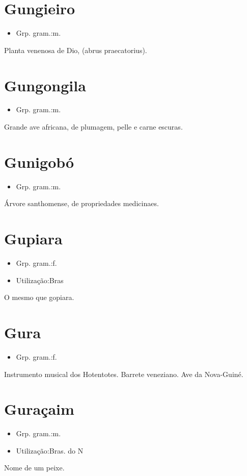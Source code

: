 \section{Gungieiro}
\begin{itemize}
\item {Grp. gram.:m.}
\end{itemize}
Planta venenosa de Dio, (\textunderscore abrus praecatorius\textunderscore ).
\section{Gungongila}
\begin{itemize}
\item {Grp. gram.:m.}
\end{itemize}
Grande ave africana, de plumagem, pelle e carne escuras.
\section{Gunigobó}
\begin{itemize}
\item {Grp. gram.:m.}
\end{itemize}
Árvore santhomense, de propriedades medicinaes.
\section{Gupiara}
\begin{itemize}
\item {Grp. gram.:f.}
\end{itemize}
\begin{itemize}
\item {Utilização:Bras}
\end{itemize}
O mesmo que \textunderscore gopiara\textunderscore .
\section{Gura}
\begin{itemize}
\item {Grp. gram.:f.}
\end{itemize}
Instrumento musical dos Hotentotes.
Barrete veneziano.
Ave da Nova-Guiné.
\section{Guraçaim}
\begin{itemize}
\item {Grp. gram.:m.}
\end{itemize}
\begin{itemize}
\item {Utilização:Bras. do N}
\end{itemize}
Nome de um peixe.
